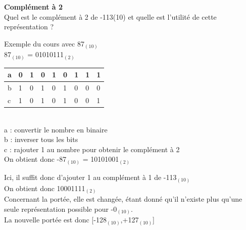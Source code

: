\begin{Exercice}[5 minutes] \textbf{Complément à 2}\\
    Quel est le complément à 2 de -113(10) et quelle est l'utilité de cette représentation ? \\

    \begin{conseil}
    
    Exemple du cours avec 87$_{(10)}$ \\
    
    87$_{(10)}$ = 01010111$_{(2)}$ \\
    
         \begin{tabular}{| p{1cm} | p{1cm} | p{1cm} | p{1cm} | p{1cm} | p{1cm} | p{1cm} | p{1cm} | p{1cm} |} 
            \hline
            a & 0 & 1 & 0 & 1 & 0 & 1 & 1 & 1 \\ [0.5ex] 
            \hline
            b & 1 & 0 & 1 & 0 & 1 & 0 & 0 & 0 \\ [0.5ex]
            \hline
            c & 1 & 0 & 1 & 0 & 1 & 0 & 0 & 1 \\ [0.5ex]
            \hline
        \end{tabular} \\
        
        a : convertir le nombre en binaire \\
        
        b : inverser tous les bits \\
        
        c : rajouter 1 au nombre pour obtenir le complément à 2 \\
        
        On obtient donc -87$_{(10)}$ = 10101001$_{(2)}$ \\
    \end{conseil}
    
    \begin{solution}
    	Ici, il suffit donc d'ajouter 1 au complément à 1 de -113$_{(10)}$ \\
    	
    	On obtient donc 10001111$_{(2)}$ \\
    	
    	Concernant la portée, elle est changée, étant donné qu'il n'existe plus qu'une seule représentation possible pour -0$_{(10)}$. \\
    	
    	La nouvelle portée est donc [-128$_{(10)}$,+127$_{(10)}$]
        
    \end{solution}
\end{Exercice}

